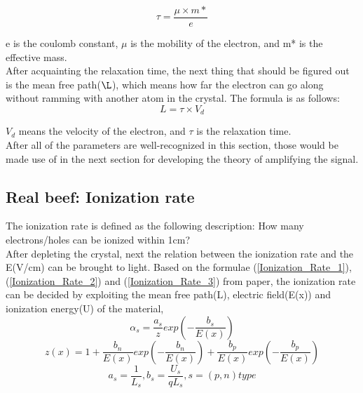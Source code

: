\documentclass[%
 reprint,
 amsmath,amssymb,
 aps,
]{revtex4-2}
\begin{document}
\begin{equation}
\tau = \frac{\mu \times m*}{e}
\end{equation}

e is the coulomb constant, $\mu$ is the mobility of the electron, and m* is the effective mass.\\
	
After acquainting the relaxation time, the next thing that should be figured out is the mean free path($\L$), which means how far the electron can go along without ramming with another atom in the crystal. The formula is as follows:\\
\begin{equation}
\label{MFP}
L = \tau \times V_{d}
\end{equation}

$V_{d}$ means the velocity of the electron, and $\tau$ is the relaxation time.\\

After all of the parameters are well-recognized in this section, those would be made use of in the next section for developing the theory of amplifying the signal.\\
\subsection{Real beef: Ionization rate}
The ionization rate is defined as the following description: How many electrons/holes can be ionized within 1cm?\\

After depleting the crystal, next the relation between the ionization rate and the E(V/cm) can be brought to light. Based on the formulae (\ref{Ionization_Rate_1}),(\ref{Ionization_Rate_2}) and (\ref{Ionization_Rate_3}) from paper\cite{2}, the ionization rate can be decided by exploiting the mean free path(L), electric field(E(x)) and ionization energy(U) of the material, 
\begin{equation}\label{Ionization_Rate_1}
\alpha_{s} = \frac{a_{s}}{z} exp(-\frac{b_{s}}{E(x)})
\end{equation}
 \begin{equation}\label{Ionization_Rate_2}
z(x) = 1 + \frac{b_{n}}{E(x)} exp(-\frac{b_{n}}{E(x)}) + \frac{b_{p}}{E(x)} exp(-\frac{b_{p}}{E(x)})
\end{equation}
 \begin{equation}\label{Ionization_Rate_3}
a_{s} = \frac{1}{L_{s}}, b_{s} = \frac{U_{s}}{qL_{s}}, s = ( p , n ) type
\end{equation}
\end{document}
